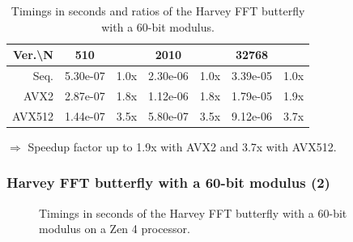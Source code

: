 \documentclass[10pt]{beamer}
\begin{document}
\begin{frame}
\begin{table}[h!]
{\begin{tabular}{|r|*{3}{c c|}}
            \hline
            \rowcolor{myGray}
            Ver.\textbackslash N & 510 & & 2010 & & 32768 & \\
            \hline
            \cellcolor{myGray} Seq. & 5.30e-07 & 1.0x & 2.30e-06 & 1.0x & 3.39e-05 & 1.0x \\
            \hline
            \cellcolor{myGray} AVX2 & 2.87e-07 & 1.8x & 1.12e-06 & 1.8x & 1.79e-05 & 1.9x \\
            \hline
            \cellcolor{myGray} AVX512 & 1.44e-07 & 3.5x & 5.80e-07 & 3.5x & 9.12e-06 & 3.7x \\
            \hline
        \end{tabular}
        }
        \caption{Timings in seconds and ratios of the Harvey FFT butterfly with a 60-bit modulus.}
    \end{table}
    $\Longrightarrow$ Speedup factor up to 1.9x with AVX2 and 3.7x with AVX512.
\end{frame}

\begin{frame}
    \frametitle{Harvey FFT butterfly with a 60-bit modulus (2)}

    \begin{figure}[h!]
        \begin{center}
        \end{center}
        \caption{Timings in seconds of the Harvey FFT butterfly with a 60-bit modulus on a Zen 4 processor.}
    \end{figure}
\end{frame}
\end{document}
